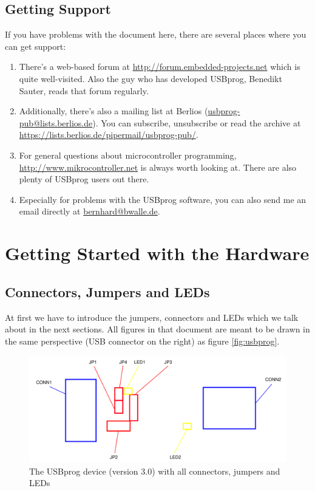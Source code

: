 \documentclass[bibtotoc,UKenglish,halfparskip,oneside,DIV12]{scrreprt}
\begin{document}
\section{Getting Support}

If you have problems with the document here, there are several places where you can get support:

\begin{enumerate}
  \item There's a web-based forum at \url{http://forum.embedded-projects.net} which is quite
    well-visited. Also the guy who has developed USBprog, Benedikt Sauter, reads that forum
    regularly.

  \item Additionally, there's also a mailing list at Berlios (\url{usbprog-pub@lists.berlios.de}).
    You can subscribe, unsubscribe or read the archive at
    \url{https://lists.berlios.de/pipermail/usbprog-pub/}.

  \item For general questions about microcontroller programming,
    \url{http://www.mikrocontroller.net} is always worth looking at. There are also plenty of
    USBprog users out there.

  \item Especially for problems with the USBprog software, you can also send me an email
    directly at \url{bernhard@bwalle.de}.
\end{enumerate}



\chapter{Getting Started with the Hardware}

\section{Connectors, Jumpers and LEDs}

At first we have to introduce the jumpers, connectors and LEDs which we talk about in the next
sections. All figures in that document are meant to be drawn in the same perspective (USB connector
on the right) as figure \vref{fig:usbprog}.

\begin{figure}[ht]
  \centering
  \includegraphics{images/usbprog_components}
  \caption{The USBprog device (version 3.0) with all connectors, jumpers and LEDs}
  \label{fig:usbprog}
\end{figure}
\end{document}
